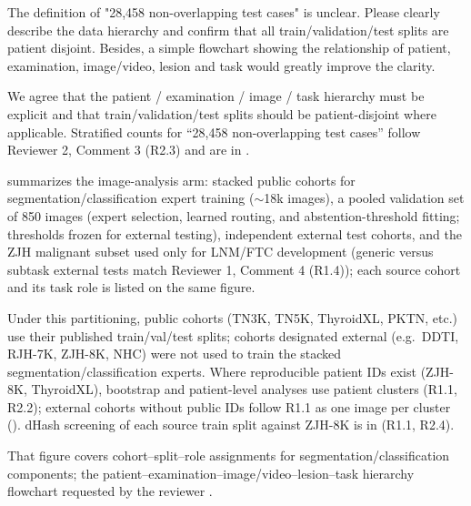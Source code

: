 \begin{reviewercomment}
The definition of "28,458 non-overlapping test cases" is unclear. Please clearly describe the data hierarchy and confirm that all train/validation/test splits are patient disjoint. Besides, a simple flowchart showing the relationship of patient, examination, image/video, lesion and task would greatly improve the clarity.
\end{reviewercomment}
\begin{authorresponse}
We agree that the patient / examination / image / task hierarchy must be explicit and that train/validation/test splits should be patient-disjoint where applicable. Stratified counts for ``28,458 non-overlapping test cases'' follow Reviewer 2, Comment 3 (R2.3) and are in .\par
{} summarizes the image-analysis arm: stacked public cohorts for segmentation/classification expert training ($\sim$18k images), a pooled validation set of 850 images (expert selection, learned routing, and abstention-threshold fitting; thresholds frozen for external testing), independent external test cohorts, and the ZJH malignant subset used only for LNM/FTC development (generic versus subtask external tests match Reviewer 1, Comment 4 (R1.4)); each source cohort and its task role is listed on the same figure.\par
Under this partitioning, public cohorts (TN3K, TN5K, ThyroidXL, PKTN, etc.) use their published train/val/test splits; cohorts designated external (e.g.\ DDTI, RJH-7K, ZJH-8K, NHC) were not used to train the stacked segmentation/classification experts. Where reproducible patient IDs exist (ZJH-8K, ThyroidXL), bootstrap and patient-level analyses use patient clusters (R1.1, R2.2); external cohorts without public IDs follow R1.1 as one image per cluster (). dHash screening of each source train split against ZJH-8K is in  (R1.1, R2.4).\par
That figure covers cohort--split--role assignments for segmentation/classification components; the patient--examination--image/video--lesion--task hierarchy flowchart requested by the reviewer .\par
\par
\end{authorresponse}

